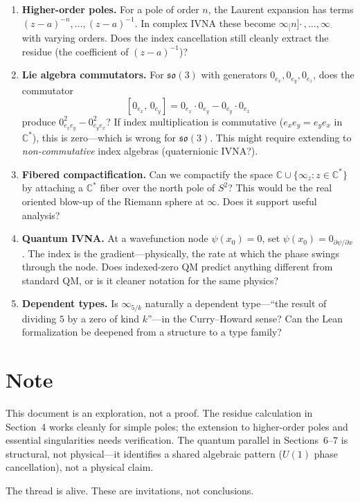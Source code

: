 \documentclass[11pt,a4paper]{article}
\newcommand{\vi}[1]{0_{#1}}          %
\newcommand{\vinf}[1]{\infty_{#1}}   %
\begin{document}
\begin{enumerate}
  \item \textbf{Higher-order poles.} For a pole of order $n$, the Laurent expansion has terms $(z-a)^{-n}, \ldots, (z-a)^{-1}$. In complex IVNA these become $\vinf[n]{\cdot\,}, \ldots, \vinf{\cdot}$ with varying orders. Does the index cancellation still cleanly extract the residue (the coefficient of $(z-a)^{-1}$)?

  \item \textbf{Lie algebra commutators.} For $\mathfrak{so}(3)$ with generators $\vi{e_x}, \vi{e_y}, \vi{e_z}$, does the commutator
  \[
    [\vi{e_x},\, \vi{e_y}] = \vi{e_x}\cdot\vi{e_y} - \vi{e_y}\cdot\vi{e_x}
  \]
  produce $0^2_{e_x e_y} - 0^2_{e_y e_x}$? If index multiplication is commutative ($e_x e_y = e_y e_x$ in $\mathbb{C}^*$), this is zero---which is wrong for $\mathfrak{so}(3)$. This might require extending to \emph{non-commutative} index algebras (quaternionic IVNA?).

  \item \textbf{Fibered compactification.} Can we compactify the space $\mathbb{C} \cup \{\vinf{z} : z \in \mathbb{C}^*\}$ by attaching a $\mathbb{C}^*$ fiber over the north pole of $S^2$? This would be the real oriented blow-up of the Riemann sphere at $\infty$. Does it support useful analysis?

  \item \textbf{Quantum IVNA.} At a wavefunction node $\psi(x_0) = 0$, set $\psi(x_0) = \vi{\partial\psi/\partial x}$. The index is the gradient---physically, the rate at which the phase swings through the node. Does indexed-zero QM predict anything different from standard QM, or is it cleaner notation for the same physics?

  \item \textbf{Dependent types.} Is $\vinf{5/k}$ naturally a dependent type---``the result of dividing $5$ by a zero of kind $k$''---in the Curry--Howard sense? Can the Lean formalization be deepened from a structure to a type family?
\end{enumerate}

\section*{Note}

This document is an exploration, not a proof. The residue calculation in Section~4 works cleanly for simple poles; the extension to higher-order poles and essential singularities needs verification. The quantum parallel in Sections~6--7 is structural, not physical---it identifies a shared algebraic pattern ($U(1)$ phase cancellation), not a physical claim.

The thread is alive. These are invitations, not conclusions.
\end{document}
